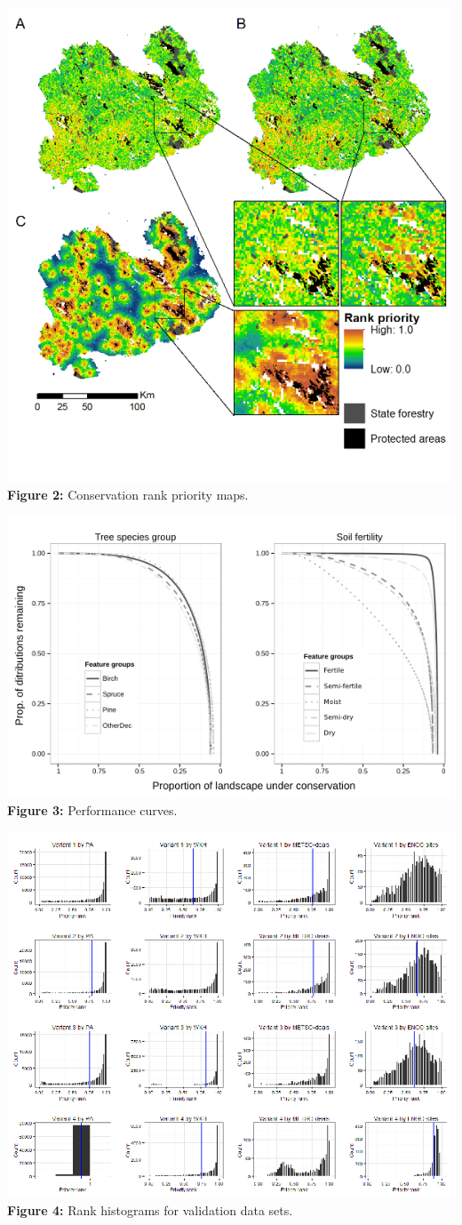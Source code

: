 \includegraphics{figs/Fig2_w500.png}\\\textbf{Figure 2:} Conservation
rank priority maps.

\includegraphics{figs/Fig3_w600.png}\\\textbf{Figure 3:} Performance
curves.

\includegraphics{figs/Fig4_w600.png}\\\textbf{Figure 4:} Rank histograms
for validation data sets.
